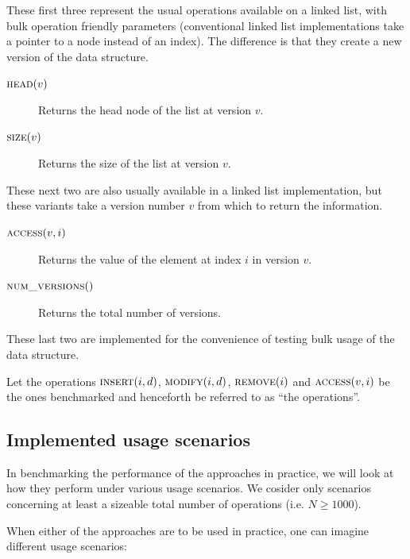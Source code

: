 These first three represent the usual operations available on a linked list,
with bulk operation friendly parameters (conventional linked list
implementations take a pointer to a node instead of an index). The difference is
that they create a new version of the data structure.

\begin{description}

  \item[$\textsc{head}(v)$] Returns the head node of the list at version
  $v$.

  \item[$\textsc{size}(v)$] Returns the size of the list at version $v$.

\end{description}

These next two are also usually available in a linked list implementation, but
these variants take a version number $v$ from which to return the information.

\begin{description}

  \item[$\textsc{access}(v,i)$] Returns the value of the element at index $i$ in
  version $v$.

  \item[$\textsc{num\_versions}()$] Returns the total number of versions.

\end{description}

These last two are implemented for the convenience of testing bulk usage of the
data structure.

Let the operations $\textsc{insert}(i,d)$, $\textsc{modify}(i,d)$,
$\textsc{remove}(i)$ and $\textsc{access}(v,i)$ be the ones benchmarked and
henceforth be referred to as ``the operations''.

\subsection{Implemented usage scenarios}

In benchmarking the performance of the approaches in practice, we will look at
how they perform under various usage scenarios. We cosider only scenarios
concerning at least a sizeable total number of operations (i.e. $N \ge 1000$).

When either of the approaches are to be used in practice, one can imagine
different usage scenarios:


